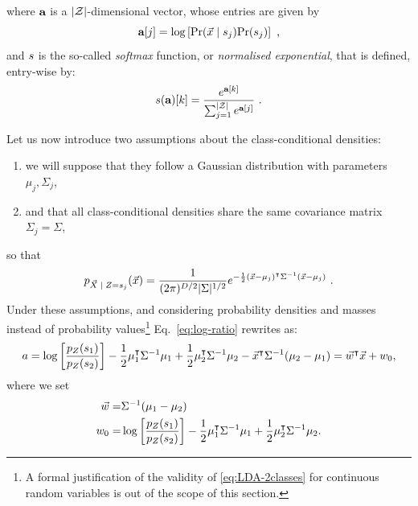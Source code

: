 where $\textbf{a}$ is a $\lvert\mathcal{Z}\rvert$-dimensional vector, whose entries are given by
\begin{equation}\label{eq:softmax_entries}
\aaa[j] = \log\left[ \prob(\given{\vLeakVec}{\sensVarValue{j}})\prob(\sensVarValue{j}) \right] \mbox{ ,}
\end{equation}
and $s$ is the so-called \emph{softmax} function, or \emph{normalised exponential}, that is defined, entry-wise by:
\begin{equation}\label{eq:softmax}
s(\textbf{a})[k] = \frac{e^{\textbf{a}[k]}}{\sum_{j=1}^{\lvert\mathcal{Z}\rvert}e^{\textbf{a}[j]}}\mbox{ .}
\end{equation}

Let us now introduce two assumptions about the class-conditional densities:
\begin{enumerate}[label=(\roman*)]
\item \label{item:gaussian} we will suppose that they follow a Gaussian distribution with parameters $\mu_j, \Sigma_j$,
\item \label{item:covariances} and that all class-conditional densities share the same covariance matrix $\Sigma_j=\Sigma$,
\end{enumerate}
so that
\begin{equation}\label{eq:gauss_dens}
\pdf_{\given{\vaLeakVec}{\sensRandVar = \sensVarValue{j}}}(\vLeakVec)= \frac{1}{(2\pi)^{{\traceLength}/2}\lvert \Sigma\rvert^{1/2}}e^{-\frac{1}{2}(\vLeakVec- \mu_j)^\intercal\Sigma^{-1}(\vLeakVec- \mu_j)} \mbox{ .}
\end{equation}
Under these assumptions, and considering probability densities and masses instead of probability values\footnote{A formal justification of the validity of \eqref{eq:LDA-2classes} for continuous random variables is out of the scope of this section.} Eq.~\eqref{eq:log-ratio} rewrites as: 
\begin{equation}\label{eq:LDA-2classes}
a = \log\left[\frac{p_{Z}(s_{1})}{p_{Z}(s_{2})}\right] - \frac{1}{2}\mu_1^\intercal\Sigma^{-1}\mu_1 + \frac{1}{2}\mu_2^\intercal\Sigma^{-1}\mu_2 - \vec{x}^\intercal\Sigma^{-1}(\mu_2-\mu_1) = \vec{w}^\intercal \vec{x} + w_0, 
\end{equation}
where we set 
\begin{align*}
\vec{w} =& \Sigma^{-1}(\mu_1-\mu_2)\\
w_0 =  & \log\left[\frac{p_{Z}(s_{1})}{p_{Z}(s_{2})}\right] - \frac{1}{2}\mu_1^\intercal\Sigma^{-1}\mu_1 + \frac{1}{2}\mu_2^\intercal\Sigma^{-1}\mu_2 . 
\end{align*}
